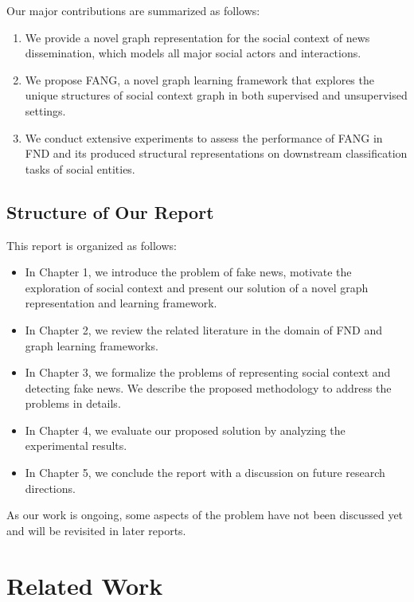 \documentclass[fyp]{socreport}
\theoremstyle{definition}
\theoremstyle{hypothesis}
\begin{document}
Our major contributions are summarized as follows:
\begin{enumerate}
    \item We provide a novel graph representation for the social context of news dissemination, which models all major social actors and interactions.
    \item We propose FANG, a novel graph learning framework that explores the unique structures of social context graph in both supervised and unsupervised settings.
    \item We conduct extensive experiments to assess the performance of FANG in FND and its produced structural representations on downstream classification tasks of social entities.
\end{enumerate}

\section{Structure of Our Report}
This report is organized as follows: 
\begin{itemize}
    \item In Chapter 1, we introduce the problem of fake news, motivate the exploration of social context and present our solution of a novel graph representation and learning framework.
    \item In Chapter 2, we review the related literature in the domain of FND and graph learning frameworks.
    \item In Chapter 3, we formalize the problems of representing social context and detecting fake news. We describe the proposed methodology to address the problems in details.
    \item In Chapter 4, we evaluate our proposed solution by analyzing the experimental results.
    \item In Chapter 5, we conclude the report with a discussion on future research directions.
\end{itemize}
As our work is ongoing, some aspects of the problem have not been discussed yet and will be revisited in later reports. 


\chapter{Related Work}
\label{ch:related}
\end{document}
